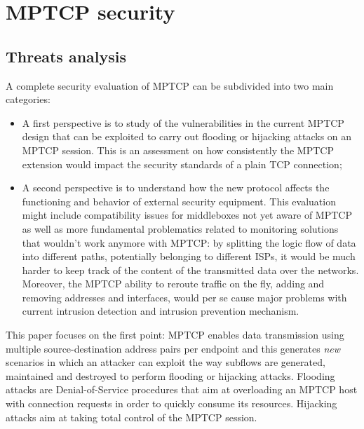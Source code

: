 \chapter{MPTCP security}
\label{chap:mptcpsecurity}

\section{Threats analysis}
A complete security evaluation of MPTCP can be subdivided into two main categories:

\begin{itemize}
  \item A first perspective is to study of the vulnerabilities in the current MPTCP design that can be exploited to carry out flooding or hijacking attacks on an MPTCP session. This is an assessment on how consistently the MPTCP extension would impact the security standards of a plain TCP connection;
  \item A second perspective is to understand how the new protocol affects the functioning and behavior of external security equipment. This evaluation might include compatibility issues for middleboxes not yet aware of MPTCP as well as more fundamental problematics related to monitoring solutions that wouldn't work anymore with MPTCP: by splitting the logic flow of data into different paths, potentially belonging to different ISPs, it would be much harder to keep track of the content of the transmitted data over the networks. Moreover, the MPTCP ability to reroute traffic on the fly, adding and removing addresses and interfaces, would per se cause major problems with current intrusion detection and intrusion prevention mechanism.
\end{itemize}

This paper focuses on the first point: MPTCP enables data transmission using multiple source-destination address pairs per endpoint and this generates \textit{new} scenarios in which an attacker can exploit the way subflows are generated, maintained and destroyed to perform flooding or hijacking attacks. 
Flooding attacks are Denial-of-Service procedures that aim at overloading an MPTCP host with connection requests in order to quickly consume its resources.
Hijacking attacks aim at taking total control of the MPTCP session.


